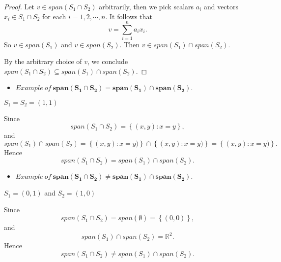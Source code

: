 \begin{Exercise}
\begin{proof}
Let $v\in span(S_1\cap S_2)$ arbitrarily, then we pick scalars $a_i$ and vectors $x_i\in S_1\cap S_2$ for each $i=1,2,\cdots,n$. It follows that
$$
v = \sum_{i=1}^{n} a_i x_i.
$$
So $v\in span(S_1)$ and $v\in span(S_2)$. Then $v\in span(S_1)\cap span(S_2)$.

By the arbitrary choice of $v$, we conclude $span(S_1\cap S_2) \subseteq span(S_1)\cap span(S_2)$.
\end{proof}
\begin{itemize}
\item $Example\ of\ \mathbf{span(S_1\cap S_2) = span(S_1)\cap span(S_2)}$.
\end{itemize}
\begin{answer}
$S_1 = S_2 = (1,1)$
\end{answer}
\begin{solution}
Since
$$
span(S_1\cap S_2) = \left\{ (x,y):x=y \right\},
$$
and
$$
span(S_1)\cap span(S_2) = \left\{ (x,y):x=y) \right\} \cap \left\{ (x,y):x=y) \right\} = \left\{ (x,y):x=y) \right\}.
$$
Hence 
$$
span(S_1\cap S_2) = span(S_1)\cap span(S_2).
$$
\end{solution}

\begin{itemize}
\item $Example\ of\ \mathbf{span(S_1\cap S_2) \neq span(S_1)\cap span(S_2)}$.
\end{itemize}
\begin{answer}
$S_1 = (0,1)$ and $S_2 = (1,0)$
\end{answer}
\begin{solution}
Since
$$
span(S_1\cap S_2) = span(\emptyset) = \left\{ (0,0) \right\},
$$
and
$$
span(S_1)\cap span(S_2) = \mathbb{R}^2.
$$
Hence 
$$
span(S_1\cap S_2) \neq span(S_1)\cap span(S_2).
$$
\end{solution}

\end{Exercise}